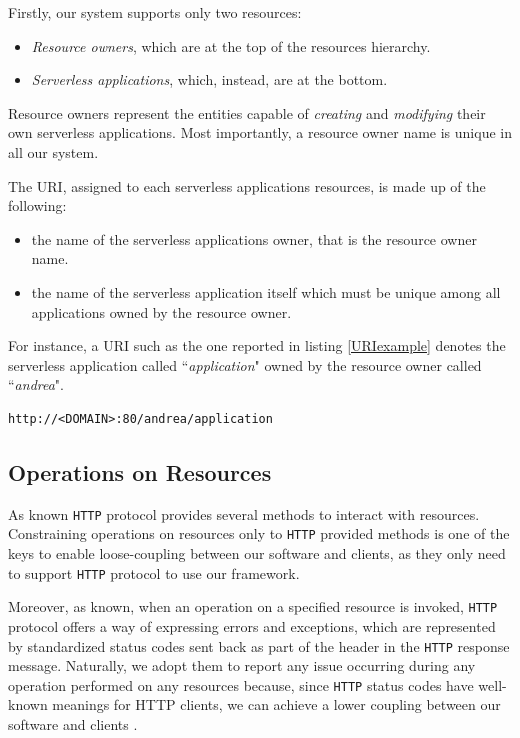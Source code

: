 \documentclass[12pt,a4paper]{report}
\newcommand{\ItalicQuotMark}[1]{``\textit{#1}"}
\begin{document}
Firstly, our system supports only two resources:

\begin{itemize}
	\item \textit{Resource owners}, which are at the top of the resources hierarchy.
	
	\item \textit{Serverless applications}, which, instead, are at the bottom.
\end{itemize}

Resource owners represent the entities capable of \textit{creating} and \textit{modifying} their own serverless applications. Most importantly, a resource owner name is unique in all our system.

The URI, assigned to each serverless applications resources, is made up of the following:

\begin{itemize}
	\item the name of the serverless applications owner, that is the resource owner name.
	\item the name of the serverless application itself which must be unique among all applications owned by the resource owner.
\end{itemize}

For instance, a URI such as the one reported in listing \ref{URIexample} denotes the serverless application called \ItalicQuotMark{application} owned by the resource owner called \ItalicQuotMark{andrea}.

\begin{lstlisting}[frame=lines, caption={A serverless application URI example}, label={URIexample}]
http://<DOMAIN>:80/andrea/application
\end{lstlisting}

\subsection{Operations on Resources}

As known \texttt{HTTP} protocol provides several methods to interact with resources. Constraining operations on resources only to \texttt{HTTP} provided methods is one of the keys to enable loose-coupling between our software and clients, as they only need to support \texttt{HTTP} protocol to use our framework\cite{Guinard}.   

Moreover, as known, when an operation on a specified resource is invoked, \texttt{HTTP} protocol offers a way of expressing errors and exceptions, which are represented by standardized status codes sent back as part of the header in the \texttt{HTTP} response message. Naturally, we adopt them to report any issue occurring during any operation performed on any resources because, since \texttt{HTTP} status codes have well-known meanings for HTTP clients, we can achieve a lower coupling between our software and clients \cite{Guinard}\cite{HTTP}. 
\end{document}

